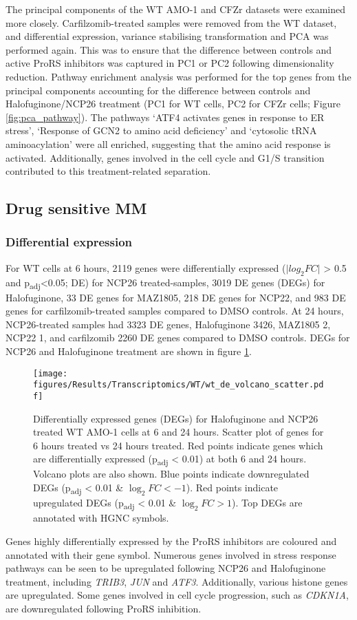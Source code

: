 The principal components of the WT AMO-1 and CFZr datasets were examined more closely.
Carfilzomib-treated samples were removed from the WT dataset, and differential expression, variance stabilising transformation and PCA was performed again.
This was to ensure that the difference between controls and active ProRS inhibitors was captured in PC1 or PC2 following dimensionality reduction.
Pathway enrichment analysis was performed for the top genes from the principal components accounting for the difference between controls and Halofuginone/NCP26 treatment (PC1 for WT cells, PC2 for CFZr cells; Figure \ref{fig:pca_pathway}).
The pathways `ATF4 activates genes in response to ER stress', `Response of GCN2 to amino acid deficiency' and `cytosolic tRNA aminoacylation' were all enriched, suggesting that the amino acid response is activated.
Additionally, genes involved in the cell cycle and G1/S transition contributed to this treatment-related separation.

\subsection{Drug sensitive MM}

\subsubsection{Differential expression}
For WT cells at 6 hours, 2119 genes were differentially expressed ($\lvert log_{2}FC \rvert$ > 0.5 and p\textsubscript{adj}<0.05; DE) for NCP26 treated-samples, 3019 DE genes (DEGs) for Halofuginone, 33 DE genes for MAZ1805, 218 DE genes for NCP22, and 983 DE genes for carfilzomib-treated samples compared to DMSO controls.
At 24 hours, NCP26-treated samples had 3323 DE genes, Halofuginone 3426, MAZ1805 2, NCP22 1, and carfilzomib 2260 DE genes compared to DMSO controls.
DEGs for NCP26 and Halofuginone treatment are shown in figure \ref{fig:wt_de}.
%
\begin{figure}[htb]
\centering
\texttt{[image: figures/Results/Transcriptomics/WT/wt\_de\_volcano\_scatter.pdf]}
\caption[Differentially expressed genes WT AMO-1 cells]{Differentially expressed genes (DEGs) for Halofuginone and NCP26 treated WT AMO-1 cells at 6 and 24 hours.
Scatter plot of genes for 6 hours treated vs 24 hours treated.
Red points indicate genes which are differentially expressed (p\textsubscript{adj} < 0.01) at both 6 and 24 hours.
Volcano plots are also shown.
Blue points indicate downregulated DEGs (p\textsubscript{adj} < 0.01 \& $\log_{2}FC < -1$).
Red points indicate upregulated DEGs (p\textsubscript{adj} < 0.01 \& $\log_{2}FC > 1$).
Top DEGs are annotated with HGNC symbols.
}
\label{fig:wt_de}
\end{figure}
Genes highly differentially expressed by the ProRS inhibitors are coloured and annotated with their gene symbol.
Numerous genes involved in stress response pathways can be seen to be upregulated following NCP26 and Halofuginone treatment, including \textit{TRIB3}, \textit{JUN} and \textit{ATF3}.
Additionally, various histone genes are upregulated.
Some genes involved in cell cycle progression, such as \textit{CDKN1A}, are downregulated following ProRS inhibition.

